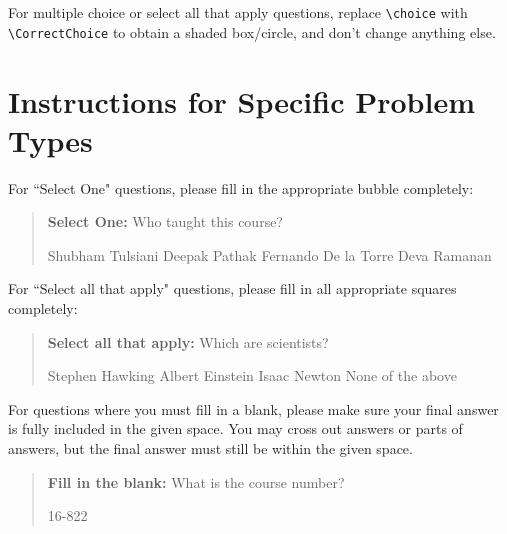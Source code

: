 \documentclass[11pt,addpoints,answers]{exam}
\numberwithin{equation}{section} %
\numberwithin{figure}{section} %
\numberwithin{table}{section} %
\begin{document}
For multiple choice or select all that apply questions, replace \lstinline{\choice} with \lstinline{\CorrectChoice} to obtain a shaded box/circle, and don't change anything else.

\clearpage

\section*{Instructions for Specific Problem Types}

For ``Select One" questions, please fill in the appropriate bubble completely:

\begin{quote}
\textbf{Select One:} Who taught this course?
     \begin{checkboxes}
     \CorrectChoice Shubham Tulsiani
     \choice Deepak Pathak
     \choice Fernando De la Torre
     \choice Deva Ramanan
    \end{checkboxes}
\end{quote}

For ``Select all that apply" questions, please fill in all appropriate squares completely:

\begin{quote}
\textbf{Select all that apply:} Which are scientists?
{
    \checkboxchar{$\Box$} \checkedchar{$\blacksquare$}
    \begin{checkboxes}
     \CorrectChoice Stephen Hawking
     \CorrectChoice Albert Einstein
     \CorrectChoice Isaac Newton
     \choice None of the above
    \end{checkboxes}
    }
\end{quote}

For questions where you must fill in a blank, please make sure your final answer is fully included in the given space. You may cross out answers or parts of answers, but the final answer must still be within the given space.

\begin{quote}
\textbf{Fill in the blank:} What is the course number?

\begin{tcolorbox}[fit,height=1cm, width=4cm, blank, borderline={1pt}{-2pt},nobeforeafter, halign=center, valign=center]
    \begin{center}\huge16-822\end{center}
    \end{tcolorbox}\hspace{2cm}
\end{quote}
\end{document}

